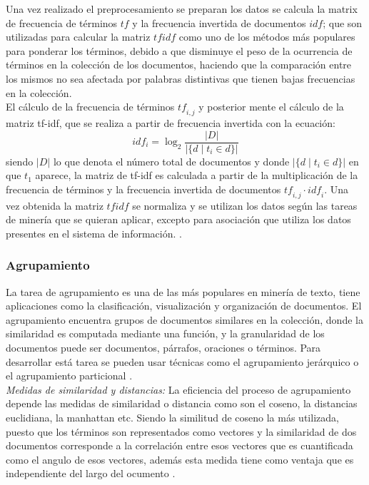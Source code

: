 {Una vez realizado el preprocesamiento se preparan los datos se calcula la matrix de frecuencia de términos $tf$ y la frecuencia invertida de documentos $idf$; que son utilizadas para calcular la matriz $tfidf$ como uno de los métodos más populares para ponderar los términos, debido a que disminuye el peso de la ocurrencia de términos en la colección de los documentos, haciendo que la comparación entre los mismos no sea afectada por palabras distintivas que tienen bajas frecuencias en la colección\cite{Renganathan2017,Allahyari2017}. \\

El cálculo de la frecuencia de términos $\mathit{tf}_{i,j}$ y posterior mente el cálculo de la matriz tf-idf, que se realiza a partir de frecuencia invertida con la ecuación: 
$${idf}_i = \log_2 \frac{|D|}{|\{d \mid t_i \in d\}|}$$
siendo $|D|$ lo que denota el número total de documentos y donde $|\{d\mid t_i \in d\}|$ en  que $t_1$ aparece, la matriz de tf-idf es calculada a partir de la multiplicación de la frecuencia de términos y la frecuencia invertida de documentos $\mathit{tf}_{i,j} \cdot \mathit{idf}_i$. Una vez obtenida la matriz $tfidf$ se normaliza y se utilizan los datos según las tareas de minería que se quieran aplicar, excepto para asociación que utiliza los datos presentes en el sistema de información. \cite{Buckley1988,VishalGupta2009}.

\subsubsection{Agrupamiento}

La tarea de agrupamiento es una de las más populares en minería de texto, tiene aplicaciones como la clasificación, visualización y organización de documentos. El agrupamiento encuentra grupos de documentos similares en la colección, donde la similaridad es computada mediante una función, y la granularidad de los documentos puede ser documentos, párrafos, oraciones o términos. Para desarrollar está tarea se pueden usar técnicas como el agrupamiento jerárquico o el agrupamiento particional \cite{Renganathan2017,Allahyari2017}.\\

\textit{Medidas de similaridad y distancias:} La eficiencia del proceso de agrupamiento depende las medidas de similaridad o distancia como son el coseno, la distancias euclidiana, la manhattan etc. Siendo la similitud de coseno la más utilizada, puesto que los términos son representados como vectores y la similaridad de dos documentos corresponde a la correlación entre esos vectores que es cuantificada como el angulo de esos vectores, además esta medida tiene como ventaja que es independiente del largo del ocumento \cite{Renganathan2017,Huang2008}.\\

}
